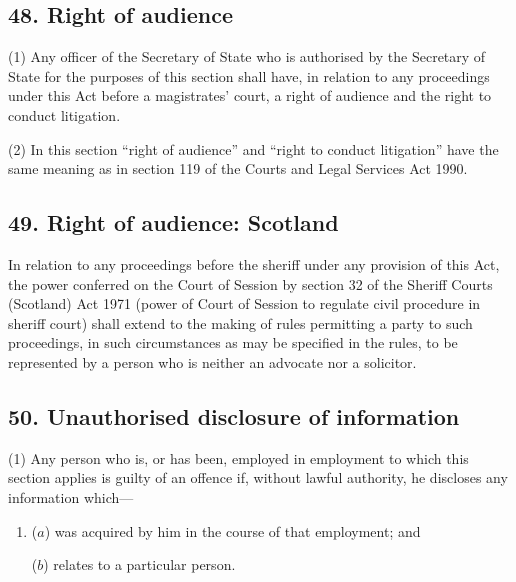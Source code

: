 \documentclass[12pt,a4paper]{article}
\begin{document}

\subsection{48. Right of audience}

(1) Any 
officer of the Secretary of State who is authorised  %
by the Secretary of State for the purposes of this section shall have, in relation to any proceedings under this Act before a magistrates' court, a right of audience and the right to conduct litigation.

(2) In this section “right of audience” and “right to conduct litigation” have the same meaning as in section 119 of the Courts and Legal Services Act 1990.


\subsection{49. Right of audience: Scotland}

In relation to any proceedings before the sheriff under any provision of this Act, the power conferred on the Court of Session by section 32 of the Sheriff Courts (Scotland) Act 1971 (power of Court of Session to regulate civil procedure in sheriff court) shall extend to the making of rules permitting a party to such proceedings, in such circumstances as may be specified in the rules, to be represented by a person who is neither an advocate nor a solicitor.


\subsection{50. Unauthorised disclosure of information}

(1) Any person who is, or has been, employed in employment to which this section applies is guilty of an offence if, without lawful authority, he discloses any information which—
\begin{enumerate}\item[]
($a$) was acquired by him in the course of that employment; and

($b$) relates to a particular person.
\end{enumerate}
\end{document}

